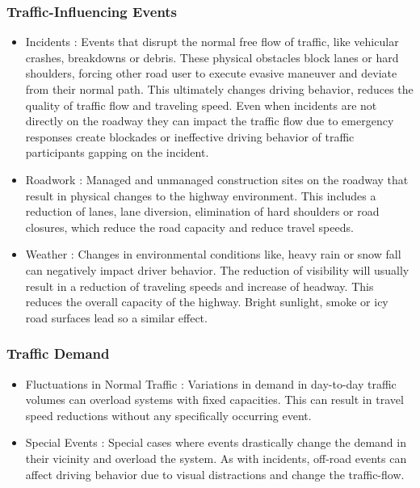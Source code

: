 \documentclass[a4paper,12pt]{report}
\begin{document}
\subsubsection{Traffic-Influencing Events}

\begin{itemize}
	\item Incidents : Events that disrupt the normal free flow of traffic, like vehicular crashes, breakdowns or debris. These physical obstacles block lanes or hard shoulders, forcing other road user to execute evasive maneuver and deviate from their normal path. This ultimately changes driving behavior, reduces the quality of traffic flow and traveling speed. Even when incidents are not directly on the roadway they can impact the traffic flow due to emergency responses create blockades or ineffective driving behavior of traffic participants gapping on the incident.
	\item Roadwork : Managed and unmanaged construction sites on the roadway that result in physical changes to the highway environment. This includes a reduction of lanes, lane diversion, elimination of hard shoulders or road closures, which reduce the road capacity and reduce travel speeds.
	\item Weather : Changes in environmental conditions like, heavy rain or snow fall can negatively impact driver behavior. The reduction of visibility will usually result in a reduction of traveling speeds and increase of headway. This reduces the overall capacity of the highway. Bright sunlight, smoke or icy road surfaces lead so a similar effect.
\end{itemize}

\subsubsection{Traffic Demand}

\begin{itemize}
	\item Fluctuations in Normal Traffic : Variations in demand in day-to-day traffic volumes can overload systems with fixed capacities. This can result in travel speed reductions without any specifically occurring event.
	\item Special Events : Special cases where events drastically change the demand in their vicinity and overload the system. As with incidents, off-road events can affect driving behavior due to visual distractions and change the traffic-flow. 
\end{itemize}
\end{document}

